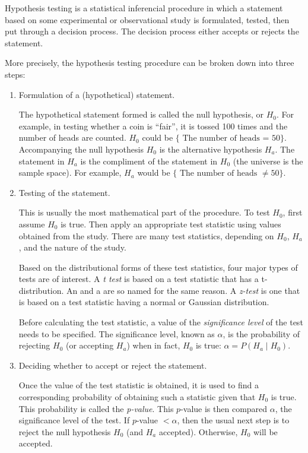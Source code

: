 \documentclass[12pt]{article}
\begin{document}

Hypothesis testing is a statistical inferencial procedure in which a statement based on some experimental or observational study is formulated, tested, then put through a decision process.  The decision process either accepts or rejects the statement.
\par
More precisely, the hypothesis testing procedure can be broken down into three steps:
\begin{enumerate}
\item Formulation of a (hypothetical) statement. \par
The hypothetical statement formed is called the null hypothesis, or $H_0$.  For example, in testing whether a coin is ``fair'', it is tossed 100 times and the number of heads are counted.  $H_0$ could be $\lbrace\mbox{ The number of heads = }50 \rbrace$.  Accompanying the null hypothesis $H_0$ is the alternative hypothesis $H_a$.  The statement in $H_a$ is the compliment of the statement in $H_0$ (the universe is the sample space).  For example, $H_a$ would be $\lbrace\mbox{ The number of heads }\neq 50 \rbrace$.
\item Testing of the statement. \par
This is usually the most mathematical part of the procedure.  To test $H_0$, first assume $H_0$ is true.  Then apply an appropriate test statistic using values obtained from the study.  There are many test statistics, depending on $H_0$, $H_a$, and the nature of the study.  \par Based on the distributional forms of these test statistics, four major types of tests are of interest.  A \emph{t test} is based on a test statistic that has a t-distribution.  An  and a  are so named for the same reason.  A \emph{z-test} is one that is based on a test statistic having a normal or Gaussian distribution. \par Before calculating the test statistic, a value of the \emph{significance level} of the test needs to be specified.  The significance level, known as $\alpha$, is the probability of rejecting $H_0$ (or accepting $H_a$) when in fact, $H_0$ is true: $\alpha=P(H_a\mid H_0)$.
\item Deciding whether to accept or reject the statement. \par
Once the value of the test statistic is obtained, it is used to find a corresponding probability of obtaining such a statistic given that $H_0$ is true.  This probability is called the \emph{p-value}.  This $p$-value is then compared $\alpha$, the significance level of the test.  If $p$-value $<\alpha$, then the usual next step is to reject the null hypothesis $H_0$ (and $H_a$ accepted).  Otherwise, $H_0$ will be accepted.
\end{enumerate}
\end{document}
